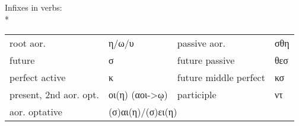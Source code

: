 \begin{small}
{}

\pagebreak

\newcommand{\tca}{\cellcolor{TableColorA}}
\newcommand{\tcb}{\cellcolor{TableColorB}}

Infixes in verbs:\\*
%
\begin{tabular}{llll}
root aor.         & η/ω/υ & passive aor.      & σθη \\
future              & σ     & future passive      & θεσ \\
perfect active      & κ     & future middle perfect & κσ \\
present, 2nd aor. opt.    & οι(η) (αοι->ῳ) & participle        & ντ\footnotemark \\
aor. optative     & \multicolumn{3}{l}{(σ)αι(η)/(σ)ει(η)}\\
\end{tabular}


\end{small}
